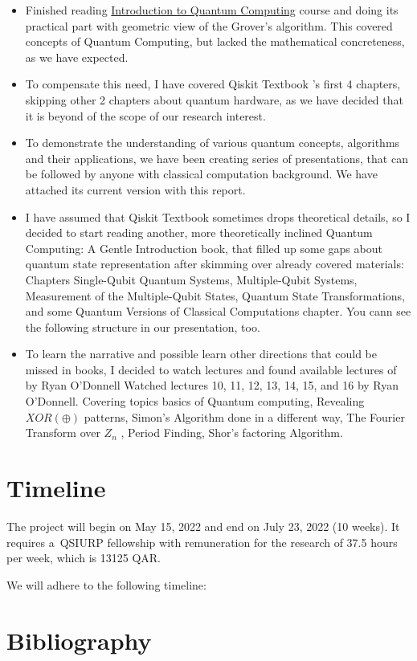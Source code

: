 \documentclass[12pt]{scrartcl}
\begin{document}
\begin{itemize}
    \item Finished reading   \href{https://qiskit.org/textbook-beta/course/introduction-course}{Introduction to Quantum Computing} \cite{ibm} course and doing its practical part with geometric view of the Grover's algorithm. This covered concepts of Quantum Computing, but lacked the mathematical concreteness, as we have expected.
    \item To compensate this need, I have covered Qiskit Textbook \cite{ibm}'s first 4 chapters, skipping other 2 chapters about quantum hardware, as we have decided that it is beyond of the scope of our research interest.
    \item To demonstrate the understanding of various quantum concepts, algorithms and their applications, we have been creating series of presentations, that can be followed by anyone with classical computation background. We have attached its current version with this report.
    \item I have assumed that Qiskit Textbook sometimes drops theoretical details, so I decided to start reading another, more theoretically inclined Quantum Computing: A Gentle Introduction \cite{rieffelbook} book, that filled up some gaps about quantum state representation after skimming over already covered materials: Chapters Single-Qubit Quantum Systems, Multiple-Qubit Systems, Measurement of the Multiple-Qubit States, Quantum State Transformations, and some Quantum Versions of Classical Computations chapter. You cann see the following structure in our presentation, too.
    
    \item To learn the narrative and possible learn other directions that could be missed in books, I decided to watch lectures and found available lectures of \href{15-859BB: Quantum Computation and Quantum Information 2018}{} by Ryan O'Donnell
    Watched lectures 10, 11, 12, 13, 14, 15, and 16 by Ryan O'Donnell. Covering topics basics of Quantum computing, Revealing $XOR (\oplus)$ patterns, Simon’s Algorithm done in a different way, The Fourier Transform over $Z_n$ , Period Finding, Shor’s factoring Algorithm.
\end{itemize}


\section{Timeline}

\hspace{\parindent} The project will begin on May 15, 2022 and end on July 23, 2022 (10 weeks). It requires a~QSIURP fellowship with remuneration for the research of 37.5 hours per week, which is 13125 QAR.

We will adhere to the following timeline:

\vspace{0.5cm}



\newpage
\section{Bibliography}
\printbibliography[heading=none]
\end{document}
